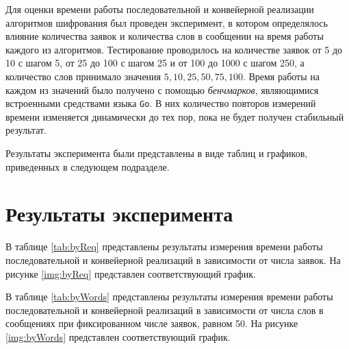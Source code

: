 Для оценки времени работы последовательной и конвейерной реализации алгоритмов
шифрования был проведен эксперимент, в котором определялось влияние количества
заявок и количества слов в сообщении на время работы каждого из алгоритмов.
Тестирование проводилось на количестве заявок от 5 до 10 с шагом 5, от 25 до
100 с шагом 25 и от 100 до 1000 с шагом 250, а количество слов принимало
значения $5, 10, 25, 50, 75, 100$. Время работы на каждом из значений было
получено с помощью \textit{бенчмарков}\cite{gotest}, являющимися встроенными
средствами языка \texttt{Go}. В них количество повторов измерений времени
изменяется динамически до тех пор, пока не будет получен стабильный результат.

Результаты эксперимента были представлены в виде таблиц и графиков, приведенных
в следующем подразделе.

\section{Результаты эксперимента}

В таблице \ref{tab:byReq} представлены результаты измерения времени работы
последовательной и конвейерной реализаций в зависимости от числа заявок.
На рисунке \ref{img:byReq} представлен соответствующий график.

В таблице \ref{tab:byWords} представлены результаты измерения времени работы
последовательной и конвейерной реализаций в зависимости от числа слов в
сообщениях при фиксированном числе заявок, равном 50.  На рисунке
\ref{img:byWords} представлен соответствующий график.

